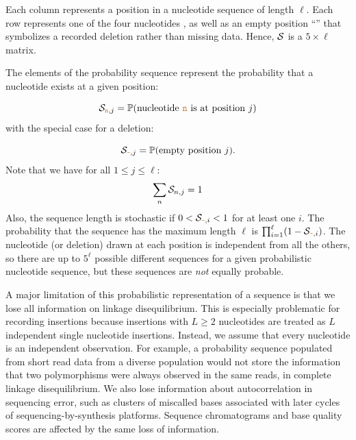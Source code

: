 \documentclass[10pt]{article}
\begin{document}
Each column represents a position in a nucleotide sequence of length $\ell$.
Each row represents one of the four nucleotides , as well as an empty position ``\sq{-}'' that symbolizes a recorded deletion rather than missing data.
Hence, $\mathcal{S}$ is a $5\times\ell$ matrix.



The elements of the probability sequence represent the probability that a nucleotide exists at a given position:

\begin{equation}
\mathcal{S}_{\texttt{\textcolor{brown}{n}},j} = \mathbb{P}(\text{nucleotide \texttt{\textcolor{brown}{n}} is at position }j)
\end{equation}
with the special case for a deletion:

\begin{equation}
\mathcal{S}_{\texttt{\textcolor{brown}{-}},j} = \mathbb{P}(\text{empty position }j).
\end{equation}
Note that we have for all $1\leq j \leq \ell$:
\begin{equation}
\sum_{n} \mathcal{S}_{n, j} = 1
\end{equation}
Also, the sequence length is stochastic if $0<\mathcal{S}_{\texttt{\textcolor{brown}{-}},i}<1$ for at least one $i$.
The probability that the sequence has the maximum length $\ell$ is $\prod_{i=1}^\ell (1-\mathcal{S}_{\texttt{\textcolor{brown}{-}},i})$.
The nucleotide (or deletion) drawn at each position is independent from all the others, so there are up to $5^\ell$ possible different sequences for a given probabilistic nucleotide sequence, but these sequences are \emph{not} equally probable.


A major limitation of this probabilistic representation of a sequence is that we lose all information on linkage disequilibrium.
This is especially problematic for recording insertions because insertions with $L \ge 2$ nucleotides are treated as $L$ independent single nucleotide insertions.
Instead, we assume that every nucleotide is an independent observation.
For example, a probability sequence populated from short read data from a diverse population would not store the information that two polymorphisms were always observed in the same reads, \ie in complete linkage disequilibrium.
We also lose information about autocorrelation in sequencing error, such as clusters of miscalled bases associated with later cycles of sequencing-by-synthesis platforms.
Sequence chromatograms and base quality scores are affected by the same loss of information.
\end{document}
